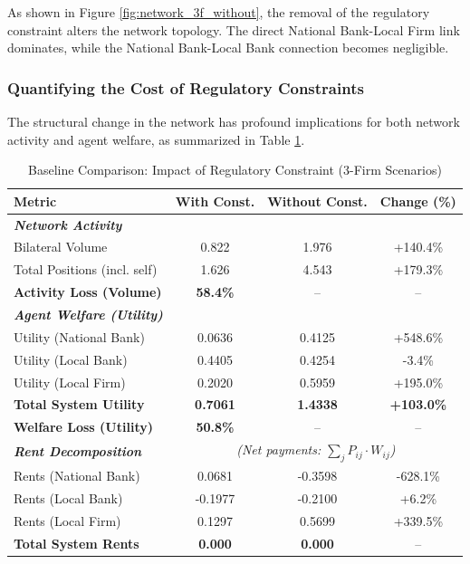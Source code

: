 As shown in Figure \ref{fig:network_3f_without}, the removal of the regulatory constraint alters the network topology. The direct National Bank-Local Firm link dominates, while the National Bank-Local Bank connection becomes negligible.

\subsubsection{Quantifying the Cost of Regulatory Constraints}

The structural change in the network has profound implications for both network activity and agent welfare, as summarized in Table \ref{tab:baselinecomparison}.

\begin{table}[h]
\centering
\caption{Baseline Comparison: Impact of Regulatory Constraint (3-Firm Scenarios)}
\label{tab:baselinecomparison}
\begin{tabular}{lccc}
\hline
\textbf{Metric} & \textbf{With Const.} & \textbf{Without Const.} & \textbf{Change (\%)} \\
\hline
\textit{\textbf{Network Activity}} & & & \\
Bilateral Volume & 0.822 & 1.976 & +140.4\% \\
Total Positions (incl. self) & 1.626 & 4.543 & +179.3\% \\
\textbf{Activity Loss (Volume)} & \textbf{58.4\%} & -- & -- \\
\hline
\textit{\textbf{Agent Welfare (Utility)}} & & & \\
Utility (National Bank) & 0.0636 & 0.4125 & +548.6\% \\
Utility (Local Bank) & 0.4405 & 0.4254 & -3.4\% \\
Utility (Local Firm) & 0.2020 & 0.5959 & +195.0\% \\ \hline
\textbf{Total System Utility} & \textbf{0.7061} & \textbf{1.4338} & \textbf{+103.0\%} \\
\textbf{Welfare Loss (Utility)} & \textbf{50.8\%} & -- & -- \\
\hline
\textit{\textbf{Rent Decomposition}} & \multicolumn{3}{c}{\textit{(Net payments: $\sum_j P_{ij} \cdot W_{ij}$)}} \\
Rents (National Bank) & 0.0681 & -0.3598 & -628.1\% \\
Rents (Local Bank) & -0.1977 & -0.2100 & +6.2\% \\
Rents (Local Firm) & 0.1297 & 0.5699 & +339.5\% \\ \hline
\textbf{Total System Rents} & \textbf{0.000} & \textbf{0.000} & -- \\
\hline
\end{tabular}
\end{table}

